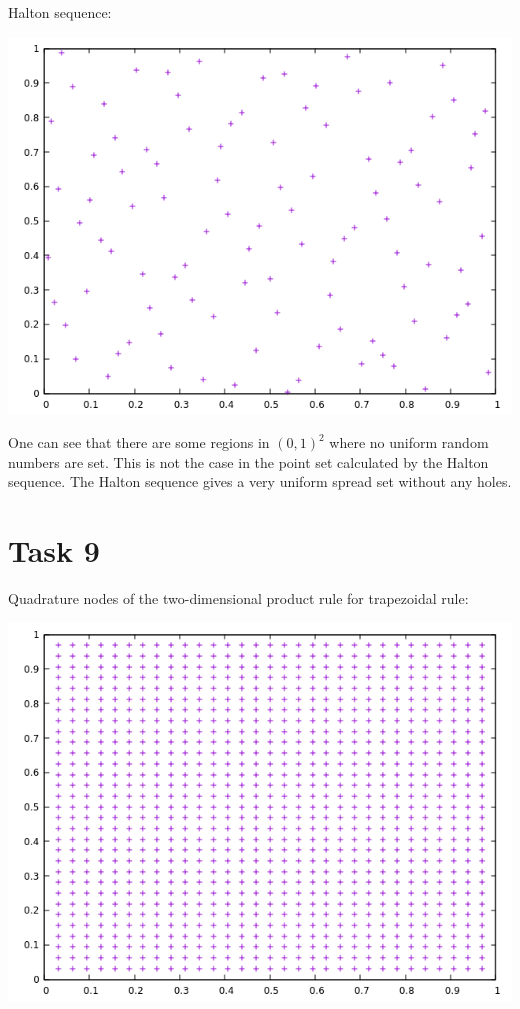 \documentclass[10pt,a4paper]{article}
\begin{document}
Halton sequence:
\begin{center}
\includegraphics[scale=0.5]{halton_sequence.png}		
\end{center}

One can see that there are some regions in $(0,1)^2$ where no uniform random numbers are set. This is not the case in the point set calculated by the Halton sequence. The Halton sequence gives a very uniform spread set without any holes.

\section*{Task 9}

Quadrature nodes of the two-dimensional product rule for trapezoidal rule:
\begin{center}
\includegraphics[scale=0.5]{quadrature_nodes_trapezoidal_rule.png}		
\end{center}
\end{document}
